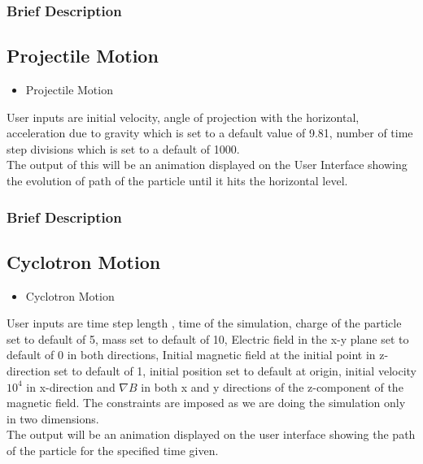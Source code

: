\documentclass{beamer}
\begin{document}
\begin{frame}
\frametitle{Brief Description}
\subsection{Projectile Motion}
\begin{itemize}
\item Projectile Motion
\end{itemize}
User inputs are initial velocity, angle of projection with the horizontal, acceleration due to gravity which is set to a default value of 9.81, number of time step divisions which is set to a default of 1000.\\
The output of this will be an animation displayed on the User Interface showing the evolution of path of the particle until it hits the horizontal level.\\
\end{frame}

\begin{frame}
\frametitle{Brief Description}
\subsection{Cyclotron Motion}
\begin{itemize}
\item Cyclotron Motion
\end{itemize}
User inputs are time step length , time of the simulation, charge of the particle set to default of 5, mass set to default of 10, Electric field in the x-y plane set to default of 0 in both directions, Initial magnetic field at the initial point in z-direction set to default of 1, initial position set to default at origin, initial velocity $10^4$ in x-direction and $\nabla B$ in both x and y directions of the z-component of the magnetic field. The constraints are imposed as we are doing the simulation only in two dimensions.\\
The output will be an animation displayed on the user interface showing the path of the particle for the specified time given.
\end{frame}
\end{document}
